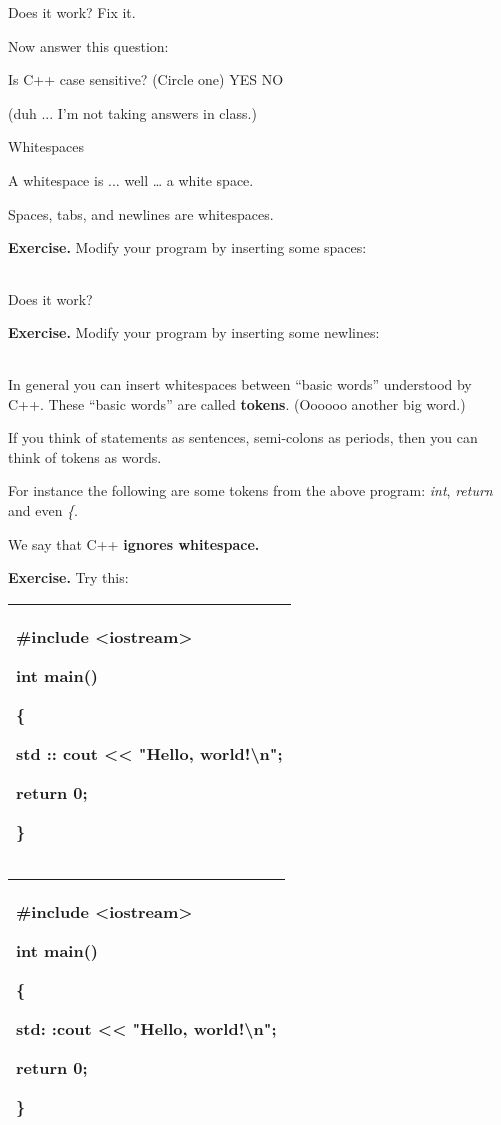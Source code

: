 \documentclass[
]{article}
\begin{document}
Does it work? Fix it.

Now answer this question:

Is C++ case sensitive? (Circle one) YES NO

(duh ... I'm not taking answers in class.)

Whitespaces

A whitespace is ... well \ldots{} a white space.

Spaces, tabs, and newlines are whitespaces.

\textbf{Exercise.} Modify your program by inserting some spaces:

\begin{longtable}[]{@{}@{}}
\toprule
\endhead
\bottomrule
\end{longtable}

Does it work?

\textbf{Exercise.} Modify your program by inserting some newlines:

\begin{longtable}[]{@{}@{}}
\toprule
\endhead
\bottomrule
\end{longtable}

In general you can insert whitespaces between ``basic words'' understood
by C++. These ``basic words'' are called \textbf{tokens}. (Oooooo
another big word.)

If you think of statements as sentences, semi-colons as periods, then
you can think of tokens as words.

For instance the following are some tokens from the above program:
\emph{int}, \emph{return} and even \emph{\{}.

We say that C++ \textbf{ignores whitespace.}

\textbf{Exercise.} Try this:

\begin{longtable}[]{@{}l@{}}
\toprule
\endhead
\begin{minipage}[t]{0.97\columnwidth}\raggedright
\#include \textless iostream\textgreater{}

int main()

\{

std :: cout \textless\textless{} "Hello,
world!\textbackslash n"\textbf{;}

return 0;

\}\strut
\end{minipage}\tabularnewline
\bottomrule
\end{longtable}

\begin{longtable}[]{@{}l@{}}
\toprule
\endhead
\begin{minipage}[t]{0.97\columnwidth}\raggedright
\#include \textless iostream\textgreater{}

int main()

\{

std: :cout \textless\textless{} "Hello,
world!\textbackslash n"\textbf{;}

return 0;

\}\strut
\end{minipage}\tabularnewline
\bottomrule
\end{longtable}
\end{document}
